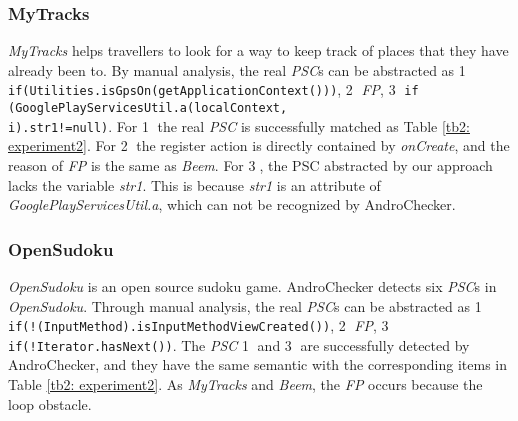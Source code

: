 \subsubsection{MyTracks}
\textit{MyTracks} helps travellers to look for a way to keep track of places that they have already been to. 
By manual analysis, the real \textit{PSC}s can be abstracted as  \textcircled{1} \texttt{if(Utilities.isGpsOn(getApplicationContext()))}, \textcircled{2} \textit{FP}, \textcircled{3} \texttt{if (GooglePlayServicesUtil.a(localContext,}\\
 \texttt{i).str1!=null)}. For  \textcircled{1} the real \textit{PSC} is successfully matched as Table \ref{tb2: experiment2}. For \textcircled{2} the register action is directly contained by \textit{onCreate}, and the reason of \textit{FP} is the same as \textit{Beem}. For \textcircled{3}, the PSC abstracted by our approach lacks the variable \textit{str1}. This is because \textit{str1} is an attribute of \textit{GooglePlayServicesUtil.a},  which can not be recognized by AndroChecker.

\subsubsection{OpenSudoku}
\textit{OpenSudoku} is an open source sudoku game. AndroChecker detects six \textit{PSC}s in \textit{OpenSudoku}.
Through manual analysis, the real \textit{PSC}s can be abstracted as  \textcircled{1} \texttt{if(!(InputMethod).isInputMethodViewCreated())}, \textcircled{2} \textit{FP}, \textcircled{3} \texttt{if(!Iterator.hasNext())}.
The \textit{PSC}  \textcircled{1} and \textcircled{3} are successfully detected by AndroChecker, and they have the same semantic with the corresponding items in Table \ref{tb2: experiment2}. As \textit{MyTracks} and \textit{Beem}, the \textit{FP} occurs because the loop obstacle.





